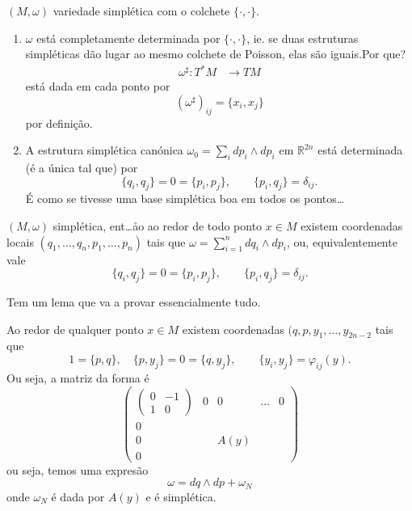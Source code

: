 $(M,\omega)$ variedade simpl\'etica com o colchete $\{\cdot ,\cdot \}$.

\begin{remark}\leavevmode
	\begin{enumerate}
		\item $\omega$ est\'a completamente determinada por $\{\cdot ,\cdot \}$, ie. se duas estruturas simpl\'eticas d\~ao lugar ao mesmo colchete de Poisson, elas s\~ao iguais.Por que?
			\begin{align*}
				\omega^\sharp: T^*M &\longrightarrow TM 
			\end{align*}
			est\'a dada em cada ponto por
			\[(\omega^\sharp )_{ij}=\{x_i,x_j\}\]
			por defini\c c\~ao.
		
		\item A estrutura simpl\'etica can\'onica $\omega_0=\sum_{i}dp_i\wedge dp_i$ em $\mathbb{R}^{2n}$ est\'a determinada (\'e a \'unica tal que) por
			\[\{q_i,q_j\}=0=\{p_i,p_j\},\qquad \{p_i,q_j\} =\delta_{ij}.\]
			\'E como se tivesse uma base simpl\'etica boa em todos os pontos…
	\end{enumerate}
\end{remark}

\begin{thm}[Darboux]\leavevmode
	$(M,\omega)$ simpl\'etica, ent…åo ao redor de todo ponto $x\in M$ existem coordenadas locais $(q_1,\ldots,q_n,p_1,\ldots,p_n)$ tais que $\omega=\sum_{i=1}^ndq_i\wedge dp_i$, ou, equivalentemente vale
		\[\{q_i,q_j\}=0=\{p_i,p_j\},\qquad \{p_i,q_j\} =\delta_{ij}.\]
\end{thm}

Tem um lema que va a provar essencialmente tudo.

\begin{lemma}
	Ao redor de qualquer ponto $x\in M$ existem coordenadas $(q,p,y_1,\ldots,y_{2n-2}$ tais que
	\[1=\{p,q\},\quad \{p,y_j\}=0=\{q,y_j\},\qquad \{y_i,y_j\} =\varphi_{ij}(y).\]
Ou seja, a matriz da forma \'e
\[\begin{pmatrix} \begin{pmatrix}0&-1\\1&0\end{pmatrix}& 0&0&\ldots&0\\
0&&&&\\
0&&A(y)&&\\
0&&&&\end{pmatrix} \]
ou seja, temos uma expres\~ao
\[\omega=dq\wedge dp+\omega_N\]
onde $\omega_N$ \'e dada por $A(y)$ e  \'e simpl\'etica.
\end{lemma}

